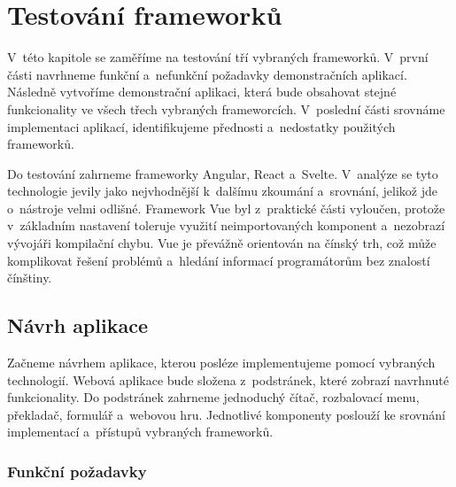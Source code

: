 \section{Testování frameworků}

V~této kapitole se zaměříme na testování tří vybraných frameworků. V~první části navrhneme funkční a~nefunkční požadavky demonstračních aplikací. 
Následně vytvoříme demonstrační aplikaci, která bude obsahovat stejné funkcionality ve všech třech vybraných frameworcích. 
V~poslední části srovnáme implementaci aplikací, identifikujeme přednosti a~nedostatky použitých frameworků.

Do testování zahrneme frameworky Angular, React a~Svelte. V~analýze se tyto technologie jevily jako nejvhodnější k~dalšímu zkoumání a~srovnání, jelikož jde o~nástroje velmi odlišné. 
Framework Vue byl z~praktické části vyloučen, protože v~základním nastavení toleruje využití neimportovaných komponent a~nezobrazí vývojáři kompilační chybu. 
Vue je převážně orientován na čínský trh, což může komplikovat řešení problémů a~hledání informací programátorům bez znalostí čínštiny.

\subsection{Návrh aplikace}

Začneme návrhem aplikace, kterou posléze implementujeme pomocí vybraných technologií. 
Webová aplikace bude složena z~podstránek, které zobrazí navrhnuté funkcionality. 
Do podstránek zahrneme jednoduchý čítač, rozbalovací menu, překladač, formulář a~webovou hru. 
Jednotlivé komponenty poslouží ke srovnání implementací a~přístupů vybraných frameworků.

\subsubsection{Funkční požadavky}

